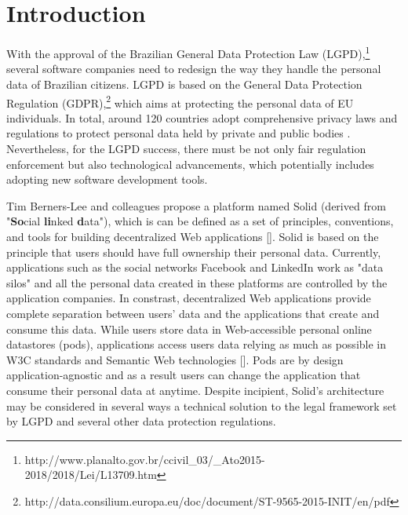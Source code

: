 \documentclass[sigconf]{acmart}
\begin{document}

%

%
\maketitle

\section{Introduction}

With the approval of the Brazilian General Data Protection Law (LGPD),\footnote{http://www.planalto.gov.br/ccivil\_03/\_Ato2015-2018/2018/Lei/L13709.htm} several software companies need to redesign the way they handle the personal data of Brazilian citizens. LGPD is based on the General Data Protection Regulation (GDPR),\footnote{http://data.consilium.europa.eu/doc/document/ST-9565-2015-INIT/en/pdf} which aims at protecting the personal data of EU individuals. In total, around 120 countries adopt comprehensive privacy laws and regulations to protect personal data held by private and public bodies \cite{Banisar2011}. Nevertheless, for the LGPD success, there must be not only fair regulation enforcement but also technological advancements, which potentially includes adopting new software development tools.


Tim Berners-Lee and colleagues propose a platform named Solid (derived from "\textbf{So}cial \textbf{li}nked \textbf{d}ata"), which is can be defined as a set of principles, conventions, and tools for building decentralized Web applications []. Solid is based on the principle that users should have full ownership their personal data. Currently, applications such as the social networks Facebook and LinkedIn work as "data silos" and all the personal data created in these platforms are controlled by the application companies. In constrast, decentralized Web applications provide complete separation between users' data and the applications that create and consume this data. While users store data in Web-accessible personal online datastores (pods), applications access users data relying as much as possible in W3C standards and Semantic Web technologies []. Pods are by design application-agnostic and as a result users can change the application that consume their personal data at anytime. Despite incipient, Solid's architecture may be considered in several ways a technical solution to the legal framework set by LGPD and several other data protection regulations.
\end{document}
